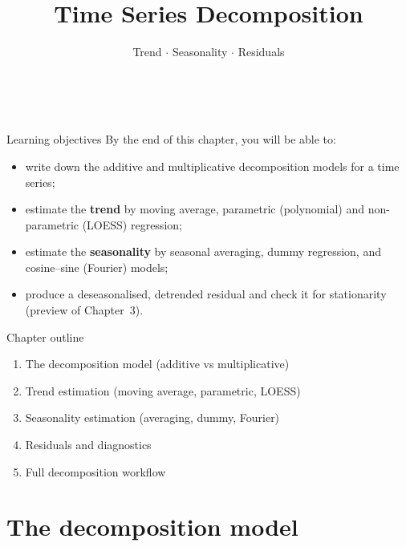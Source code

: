 \documentclass[aspectratio=169]{beamer}
\title[\moduleNom\ -- Ch.2]{Time Series Decomposition}
\subtitle{Trend $\cdot$ Seasonality $\cdot$ Residuals}
\author{\auteurNom \\ \footnotesize\auteurEmail}
\institute{\auteurInstitution}
\date{\anneeUniversitaire}
\begin{document}
\begin{frame}\titlepage\end{frame}

\begin{frame}{Learning objectives}
  By the end of this chapter, you will be able to:
  \begin{itemize}
    \item write down the additive and multiplicative decomposition
          models for a time series;
    \item estimate the \textbf{trend} by moving average, parametric
          (polynomial) and non-parametric (LOESS) regression;
    \item estimate the \textbf{seasonality} by seasonal averaging,
          dummy regression, and cosine--sine (Fourier) models;
    \item produce a deseasonalised, detrended residual and check it
          for stationarity (preview of Chapter~3).
  \end{itemize}
\end{frame}

\begin{frame}{Chapter outline}
  \begin{enumerate}
    \item The decomposition model (additive vs multiplicative)
    \item Trend estimation (moving average, parametric, LOESS)
    \item Seasonality estimation (averaging, dummy, Fourier)
    \item Residuals and diagnostics
    \item Full decomposition workflow
  \end{enumerate}
\end{frame}

\section{The decomposition model}
\end{document}
